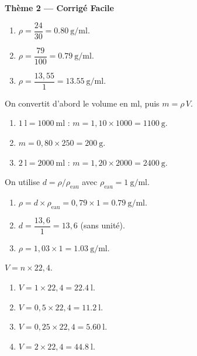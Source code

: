 \documentclass[11pt,a4paper]{article}
\begin{document}
\begin{center}{\large\bfseries\color{primarydark} Thème 2 — Corrigé Facile}\end{center}

\begin{corrige}
\begin{enumerate}[label=\alph*)]
  \item $\rho = \dfrac{24}{30} = \SI{0.80}{\gram\per\milli\litre}$.
  \item $\rho = \dfrac{79}{100} = \SI{0.79}{\gram\per\milli\litre}$.
  \item $\rho = \dfrac{13{,}55}{1} = \SI{13.55}{\gram\per\milli\litre}$.
\end{enumerate}
\end{corrige}

\begin{corrige}
On convertit d'abord le volume en \si{\milli\litre}, puis $m = \rho\,V$.
\begin{enumerate}[label=\alph*)]
  \item $\SI{1}{\litre} = \SI{1000}{\milli\litre}$ : $m = 1{,}10\times 1000 = \SI{1100}{\gram}$.
  \item $m = 0{,}80\times 250 = \SI{200}{\gram}$.
  \item $\SI{2}{\litre} = \SI{2000}{\milli\litre}$ : $m = 1{,}20\times 2000 = \SI{2400}{\gram}$.
\end{enumerate}
\end{corrige}

\begin{corrige}
On utilise $d = \rho / \rho_{\text{eau}}$ avec $\rho_{\text{eau}} = \SI{1}{\gram\per\milli\litre}$.
\begin{enumerate}[label=\alph*)]
  \item $\rho = d\times\rho_{\text{eau}} = 0{,}79\times 1 = \SI{0.79}{\gram\per\milli\litre}$.
  \item $d = \dfrac{13{,}6}{1} = 13{,}6$ (sans unité).
  \item $\rho = 1{,}03\times 1 = \SI{1.03}{\gram\per\milli\litre}$.
\end{enumerate}
\end{corrige}

\begin{corrige}
$V = n\times 22{,}4$.
\begin{enumerate}[label=\alph*)]
  \item $V = 1\times 22{,}4 = \SI{22.4}{\litre}$.
  \item $V = 0{,}5\times 22{,}4 = \SI{11.2}{\litre}$.
  \item $V = 0{,}25\times 22{,}4 = \SI{5.60}{\litre}$.
  \item $V = 2\times 22{,}4 = \SI{44.8}{\litre}$.
\end{enumerate}
\end{corrige}
\end{document}
